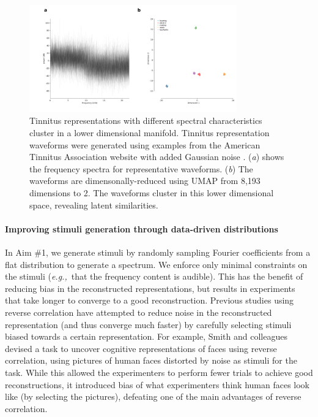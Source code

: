 \documentclass[11pt, notitlepage]{article} %
\def\eg{{\emph{e.g.,}}~}
\begin{document}
\begin{figure}[h] %
	\centering
	\includegraphics[width=0.8\textwidth]{Figures/umap.png}
	\caption{Tinnitus representations with different spectral characteristics cluster in a lower dimensional manifold.
	Tinnitus representation waveforms were generated
	using examples from the American Tinnitus Association website with added Gaussian noise
	\cite{Symptoms2015}.
	(\emph{a}) shows the frequency spectra for representative waveforms. (\emph{b}) The waveforms
	are dimensonally-reduced using UMAP from 8,193 dimensions to 2.
	The waveforms cluster in this lower dimensional space, revealing latent similarities.}
	\label{fig:dimredexample}
\end{figure}

\paragraph{Improving stimuli generation through data-driven distributions}

In Aim \#1, we generate stimuli by randomly sampling Fourier coefficients from a flat distribution to generate a spectrum.
We enforce only minimal constraints on the stimuli (\eg that the frequency content is audible).
This has the benefit of reducing bias in the reconstructed representations,
but results in experiments that take longer to converge to a good reconstruction.
Previous studies using reverse correlation have attempted to reduce noise in the reconstructed representation
(and thus converge much faster) by carefully selecting stimuli biased towards a certain representation.
For example, Smith and colleagues \cite{smithMeasuringInternalRepresentations2012}
devised a task to uncover cognitive representations of faces using reverse correlation,
using pictures of human faces distorted by noise as stimuli for the task.
While this allowed the experimenters to perform fewer trials to achieve good reconstructions,
it introduced bias of what experimenters think human faces look like (by selecting the pictures),
defeating one of the main advantages of reverse correlation.
\end{document}
